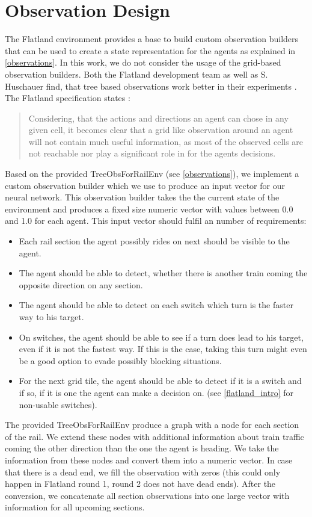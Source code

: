 \section{Observation Design}\label{enhanced_observations}
The Flatland environment provides a base to build custom observation builders that can be used to create a state representation for the agents as explained in \autoref{observations}. In this work, we do not consider the usage of the grid-based observation builders.
Both the Flatland development team as well as S. Huschauer find, that tree based observations work better in their experiments \cite{flatlandstephan}. The Flatland specification states \cite{flatland_spec}:
\begin{quote}
	Considering, that the actions and directions an agent can chose in any given cell, it becomes clear that a grid like observation around an agent will not contain much useful information, as most of the observed cells are not reachable nor play a significant role in for the agents decisions.
\end{quote}
Based on the provided TreeObsForRailEnv (see \autoref{observations}), we implement a custom observation builder which we use to produce an input vector for our neural network. This observation builder takes the the current state of the environment and produces a fixed size numeric vector with values between 0.0 and 1.0 for each agent. This input vector should fulfil an number of requirements:
\begin{itemize}
	\item Each rail section the agent possibly rides on next should be visible to the agent.
	\item The agent should be able to detect, whether there is another train coming the opposite direction on any section.
	\item The agent should be able to detect on each switch which turn is the faster way to his target.
	\item On switches, the agent should be able to see if a turn does lead to his target, even if it is not the fastest way. If this is the case, taking this turn might even be a good option to evade possibly blocking situations.
	\item For the next grid tile, the agent should be able to detect if it is a switch and if so, if it is one the agent can make a decision on. (see \autoref{flatland_intro} for non-usable switches).
\end{itemize}
The provided TreeObsForRailEnv produce a graph with a node for each section of the rail. We extend these nodes with additional information about train traffic coming the other direction than the one the agent is heading. We take the information from these nodes and convert them into a numeric vector. In case that there is a dead end, we fill the observation with zeros (this could only happen in Flatland round 1, round 2 does not have dead ends). After the conversion, we concatenate all section observations into one large vector with information for all upcoming sections.\\
